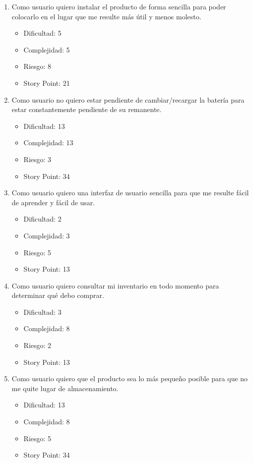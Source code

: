 \documentclass[
11pt, %
codirector, %
]{charter}
\begin{document}
\begin{enumerate}
    \item Como usuario quiero instalar el producto de forma sencilla para poder colocarlo en el lugar que me resulte más útil y menos molesto.
        \begin{itemize}
            \item Dificultad: 5
            \item Complejidad: 5
            \item Riesgo: 8
            \item Story Point: 21
        \end{itemize}

     \item Como usuario no quiero estar pendiente de cambiar/recargar la batería para estar constantemente pendiente de su remanente.
        \begin{itemize}
            \item Dificultad: 13
            \item Complejidad: 13
            \item Riesgo: 3
            \item Story Point: 34
        \end{itemize}

    \item Como usuario quiero una interfaz de usuario sencilla para que me resulte fácil de aprender y fácil de usar.
        \begin{itemize}
            \item Dificultad: 2
            \item Complejidad: 3
            \item Riesgo: 5
            \item Story Point: 13
        \end{itemize}

    \item Como usuario quiero consultar mi inventario en todo momento para determinar qué debo comprar.
        \begin{itemize}
            \item Dificultad: 3
            \item Complejidad: 8
            \item Riesgo: 2
            \item Story Point: 13
        \end{itemize}
    \item Como usuario quiero que el producto sea lo más pequeño posible para que no me quite lugar de almacenamiento.
        \begin{itemize}
            \item Dificultad: 13
            \item Complejidad: 8
            \item Riesgo: 5
            \item Story Point: 34
        \end{itemize}
\end{enumerate}
\end{document}
